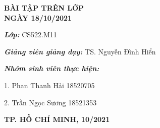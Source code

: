 \begin{titlepage}
\begin{center}
		\textbf{BÀI TẬP TRÊN LỚP}\\
		\textbf{NGÀY 18/10/2021}
		
	\end{center}
			
		\vspace{1.25cm}
		\normalsize	
		
		\hspace{70pt} \textbf{\textit{Lớp:}} CS522.M11
		
		\vspace*{0.1cm}
		
		\hspace{70pt} \textbf{\textit{Giảng viên giảng dạy:}} TS. Nguyễn Đình Hiển
			
		\vspace*{0.1cm}
			
		\hspace{70pt} \textbf{\textit{Nhóm sinh viên thực hiện:}}
		
		\hspace{70pt} 1. \hspace{10pt} Phan Thanh Hải \hspace{98pt} 18520705
		
		\hspace{70pt} 2. \hspace{10pt} Trần Ngọc Sương \hspace{95pt} 18521353
			
		\vspace{2.5cm}
		
	\begin{center}
		\textbf{TP. HỒ CHÍ MINH, 10/2021}
    \end{center}

\end{titlepage}